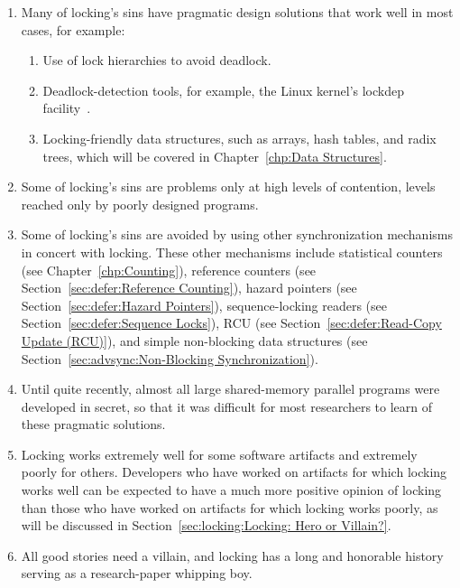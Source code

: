 \begin{enumerate}
\item	Many of locking's sins have pragmatic design solutions that
	work well in most cases, for example:
	\begin{enumerate}
	\item	Use of lock hierarchies to avoid deadlock.
	\item	Deadlock-detection tools, for example, the Linux kernel's
		lockdep facility~\cite{JonathanCorbet2006lockdep}.
	\item	Locking-friendly data structures, such as
		arrays, hash tables, and radix trees, which will
		be covered in Chapter~\ref{chp:Data Structures}.
	\end{enumerate}
\item	Some of locking's sins are problems only at high levels of
	contention, levels reached only by poorly designed programs.
\item	Some of locking's sins are avoided by using other synchronization
	mechanisms in concert with locking.
	These other mechanisms include
	statistical counters
	(see Chapter~\ref{chp:Counting}),
	reference counters
	(see Section~\ref{sec:defer:Reference Counting}),
	hazard pointers
	(see Section~\ref{sec:defer:Hazard Pointers}),
	sequence-locking readers
	(see Section~\ref{sec:defer:Sequence Locks}),
	RCU
	(see Section~\ref{sec:defer:Read-Copy Update (RCU)}),
	and simple non-blocking data structures
	(see Section~\ref{sec:advsync:Non-Blocking Synchronization}).
\item	Until quite recently, almost all large shared-memory parallel
	programs were developed in secret, so that it was difficult for
	most researchers to learn of these pragmatic solutions.
\item	Locking works extremely well for some software artifacts
	and extremely poorly for others.
	Developers who have worked on artifacts for which locking
	works well can be expected to have a much more positive
	opinion of locking than those who have worked on artifacts
	for which locking works poorly, as will be discussed in
	Section~\ref{sec:locking:Locking: Hero or Villain?}.
\item	All good stories need a villain, and locking has a long and
	honorable history serving as a research-paper whipping boy.
\end{enumerate}

\QuickQuizEnd

